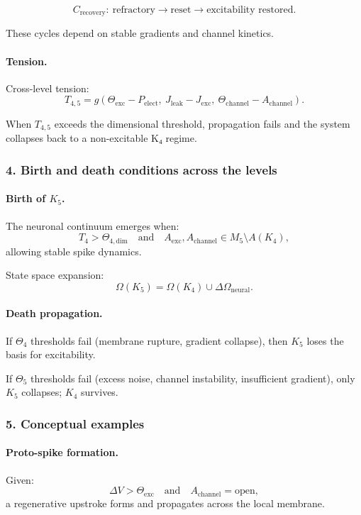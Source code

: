 \[
C_{\mathrm{recovery}}:\ \text{refractory} \rightarrow \text{reset}
\rightarrow \text{excitability restored}.
\]

These cycles depend on stable gradients and channel kinetics.

\paragraph{Tension.}
Cross-level tension:
\[
T_{4,5} =
g(\Theta_{\mathrm{exc}} - P_{\mathrm{elect}},\
  J_{\mathrm{leak}} - J_{\mathrm{exc}},\
  \Theta_{\mathrm{channel}} - A_{\mathrm{channel}}).
\]

When $T_{4,5}$ exceeds the dimensional threshold, propagation fails and
the system collapses back to a non-excitable K₄ regime.

\subsubsection{4. Birth and death conditions across the levels}

\paragraph{Birth of \texorpdfstring{$K_5$}{K_5}.}
The neuronal continuum emerges when:
\[
T_4 > \Theta_{4,\mathrm{dim}}
\quad\text{and}\quad
A_{\mathrm{exc}}, A_{\mathrm{channel}} \in M_5 \setminus A(K_4),
\]
allowing stable spike dynamics.

State space expansion:
\[
\Omega(K_5) = \Omega(K_4) \cup \Delta\Omega_{\mathrm{neural}}.
\]

\paragraph{Death propagation.}
If $\Theta_4$ thresholds fail (membrane rupture, gradient collapse),
then $K_5$ loses the basis for excitability.

If $\Theta_5$ thresholds fail (excess noise, channel instability,
insufficient gradient), only $K_5$ collapses; $K_4$ survives.

\subsubsection{5. Conceptual examples}

\paragraph{Proto-spike formation.}
Given:
\[
\Delta V > \Theta_{\mathrm{exc}}
\quad\text{and}\quad
A_{\mathrm{channel}} = \text{open},
\]
a regenerative upstroke forms and propagates across the local membrane.

